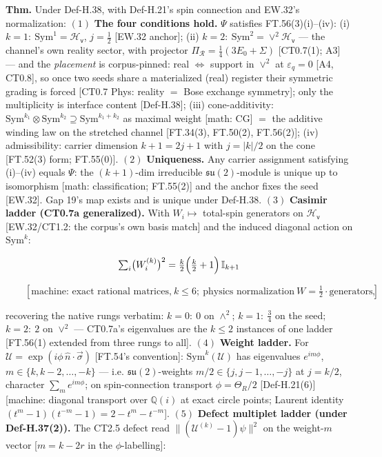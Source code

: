 \begin{theorem}\label{tag:FT-60}
\textbf{Thm.} Under Def-H.38, with Def-H.21's spin connection and EW.32's normalization: $(1)$ \textbf{The four conditions hold.} $\Psi$ satisfies FT.56(3)(i)–(iv): (i) $k{=}1:\ \mathrm{Sym}^1=\mathcal H_{\mathsf v}$, $j=\tfrac12$ [EW.32 anchor]; (ii) $k{=}2:\ \mathrm{Sym}^2=\vee^2\mathcal H_{\mathsf v}$ — the channel's own reality sector, with projector $\Pi_{\mathcal R}=\tfrac14(3E_0+\Sigma)$ [CT0.7(1); A3] — and the \textit{placement} is corpus-pinned: real $\iff$ support in $\vee^2$ at $\varepsilon_q=0$ [A4, CT0.8], so once two seeds share a materialized (real) register their symmetric grading is forced [CT0.7 Phys: reality $=$ Bose exchange symmetry]; only the multiplicity is interface content [Def-H.38]; (iii) cone-additivity: $\mathrm{Sym}^{k_1}\otimes\mathrm{Sym}^{k_2}\supseteq\mathrm{Sym}^{k_1+k_2}$ as maximal weight [math: CG] $=$ the additive winding law on the stretched channel [FT.34(3), FT.50(2), FT.56(2)]; (iv) admissibility: carrier dimension $k+1=2j+1$ with $j=|k|/2$ on the cone [FT.52(3) form; FT.55(0)]. $(2)$ \textbf{Uniqueness.} Any carrier assignment satisfying (i)–(iv) equals $\Psi$: the $(k{+}1)$-dim irreducible $\mathfrak{su}(2)$-module is unique up to isomorphism [math: classification; FT.55(2)] and the anchor fixes the seed [EW.32]. Gap 19's map exists and is unique under Def-H.38. $(3)$ \textbf{Casimir ladder (CT0.7a generalized).} With $W_i\mapsto$ total-spin generators on $\mathcal H_{\mathsf v}$ [EW.32/CT1.2: the corpus's own basis match] and the induced diagonal action on $\mathrm{Sym}^k$:

\[
\textstyle\sum_i\bigl(W_i^{(k)}\bigr)^2=\frac{k}{2}\Bigl(\frac{k}{2}+1\Bigr)\,\mathbb I_{k+1}
\]

\[
\qquad [\text{machine: exact rational matrices,}\ k\le6;\ \text{physics normalization}\ W=\tfrac12\cdot\text{generators}],
\]

recovering the native rungs verbatim: $k{=}0:\ 0$ on $\wedge^2$; $k{=}1:\ \tfrac34$ on the seed; $k{=}2:\ 2$ on $\vee^2$ — CT0.7a's eigenvalues are the $k\le2$ instances of one ladder [FT.56(1) extended from three rungs to all]. $(4)$ \textbf{Weight ladder.} For $\mathcal U=\exp(i\phi\,\hat n\cdot\vec\sigma)$ [FT.54's convention]: $\mathrm{Sym}^k(\mathcal U)$ has eigenvalues $e^{im\phi}$, $m\in\{k,k-2,\dots,-k\}$ — i.e. $\mathfrak{su}(2)$-weights $m/2\in\{j,j-1,\dots,-j\}$ at $j=k/2$, character $\sum_m e^{im\phi}$; on spin-connection transport $\phi=\Theta_R/2$ [Def-H.21(6)] [machine: diagonal transport over $\mathbb Q(i)$ at exact circle points; Laurent identity $(t^m-1)(t^{-m}-1)=2-t^m-t^{-m}$]. $(5)$ \textbf{Defect multiplet ladder (under Def-H.37(2)).} The CT2.5 defect read $\|(\mathcal U^{(k)}-1)\psi\|^2$ on the weight-$m$ vector [$m=k-2r$ in the $\phi$-labelling]:


\end{theorem}
